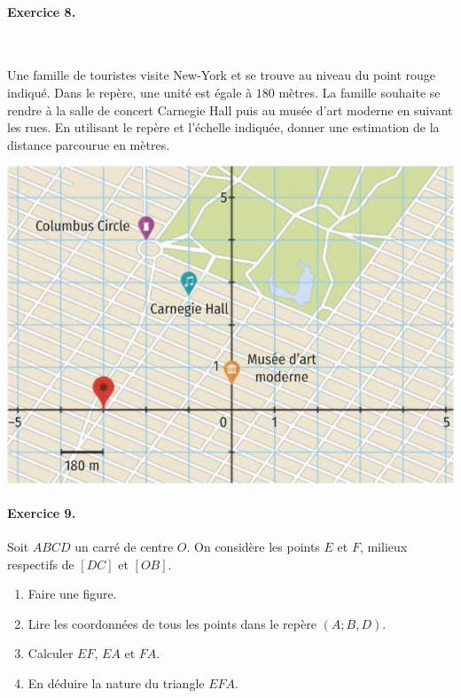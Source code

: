 \documentclass[11pt]{article}
\begin{document}
\paragraph{Exercice 8.}~\\
\begin{minipage}{.6\textwidth}
  Une famille de touristes visite New-York et se trouve au niveau du point rouge
  indiqué. Dans le repère, une unité est égale à $180$ mètres. La famille
  souhaite se rendre à la salle de concert Carnegie Hall puis au musée d'art
  moderne en suivant les rues. En utilisant le repère et l'échelle indiquée,
  donner une estimation de la distance parcourue en mètres.
\end{minipage}
\begin{minipage}{.4\textwidth}
  \begin{center}
  \includegraphics[scale=.25]{map.png}
  \end{center}
\end{minipage}

\paragraph{Exercice 9.} Soit $ABCD$ un carré de centre $O$. On considère les
points $E$ et $F$, milieux respectifs de $\left[ DC \right]$ et $\left[ OB
\right]$.
\begin{enumerate}
  \item Faire une figure.
  \item Lire les coordonnées de tous les points dans le repère $(A; B, D)$.
  \item Calculer $EF$, $EA$ et $FA$.
  \item En déduire la nature du triangle $EFA$.
\end{enumerate}
\end{document}
